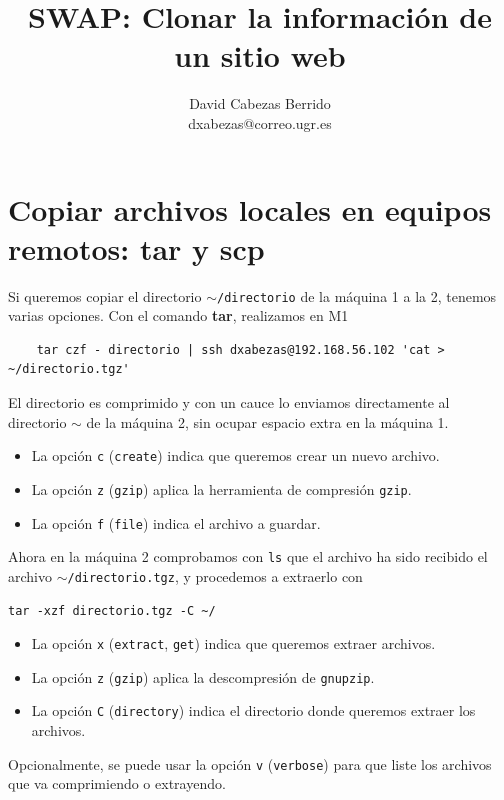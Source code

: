 \documentclass{article}
\title{\Huge SWAP: Clonar la información de un sitio web\vspace{10mm}}
\author{\huge David Cabezas Berrido \vspace{10mm} \\ 
  \huge dxabezas@correo.ugr.es \vspace{10mm}}
\begin{document}
\maketitle
\tableofcontents
\newpage

\section{Copiar archivos locales en equipos remotos: tar y scp}

Si queremos copiar el directorio \texttt{$\mathtt{\sim}$/directorio} de la máquina 1 a la 2, tenemos varias opciones.
Con el comando \textbf{tar}, realizamos en M1
\begin{lstlisting}
	tar czf - directorio | ssh dxabezas@192.168.56.102 'cat > ~/directorio.tgz'
\end{lstlisting}

El directorio es comprimido y con un cauce lo enviamos directamente al directorio \texttt{$\mathtt{\sim}$} de la máquina 2, sin ocupar
 espacio extra en la máquina 1.

\begin{itemize}
	\item La opción \texttt{c} (\texttt{create}) indica que queremos crear un nuevo archivo.
	\item La opción \texttt{z} (\texttt{gzip}) aplica la herramienta de compresión \texttt{gzip}.
	\item La opción \texttt{f} (\texttt{file}) indica el archivo a guardar.
\end{itemize}

Ahora en la máquina 2 comprobamos con \texttt{ls} que el archivo ha sido recibido el archivo \texttt{$\mathtt{\sim}$/directorio.tgz},
y procedemos a extraerlo con
\begin{lstlisting}
tar -xzf directorio.tgz -C ~/
\end{lstlisting}

\begin{itemize}
	\item La opción \texttt{x} (\texttt{extract}, \texttt{get}) indica que queremos extraer archivos.
	\item La opción \texttt{z} (\texttt{gzip}) aplica la descompresión de \texttt{gnupzip}.
	\item La opción \texttt{C} (\texttt{directory}) indica el directorio donde queremos extraer los archivos.
\end{itemize}

Opcionalmente, se puede usar la opción \texttt{v} (\texttt{verbose}) para que liste los archivos que va comprimiendo o extrayendo.
\end{document}

